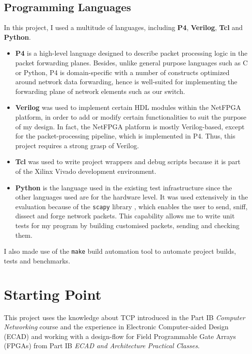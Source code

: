 \subsection{Programming Languages}
In this project, I used a multitude of languages, including \textbf{P4}, \textbf{Verilog}, \textbf{Tcl} and \textbf{Python}.

\begin{itemize}[leftmargin=*, noitemsep]
	\item \textbf{P4} \cite{bosshart2014p4} is a high-level language designed to describe packet processing logic in the packet forwarding planes. Besides, unlike general purpose languages such as C or Python, P4 is domain-specific with a number of constructs optimized around network data forwarding, hence is well-suited for implementing the forwarding plane of network elements such as our switch.
	
	\item \textbf{Verilog} was used to implement certain HDL modules within the NetFPGA platform, in order to add or modify certain functionalities to suit the purpose of my design. In fact, the NetFPGA platform is mostly Verilog-based, except for the packet-processing pipeline, which is implemented in P4. Thus, this project requires a strong grasp of Verilog. 
	
	\item \textbf{Tcl} was used to write project wrappers and debug scripts because it is part of the Xilinx Vivado development environment.
	
	\item \textbf{Python} is the language used in the existing test infrastructure since the other languages used are for the hardware level. It was used extensively in the evaluation because of the \verb|scapy| library \cite{scapy}, which enables the user to send, sniff, dissect and forge network packets. This capability allows me to write unit tests for my program by building customised packets, sending and checking them.
\end{itemize}

I also made use of the \texttt{make} build automation tool to automate project builds, tests and benchmarks.

\section{Starting Point} 
\label{sec:start}
This project uses the knowledge about TCP introduced in the Part IB \textit{Computer Networking} course and the experience in Electronic Computer-aided Design (ECAD) and working with a design-flow for Field Programmable Gate Arrays (FPGAs) from Part IB \textit{ECAD and Architecture Practical Classes}.

